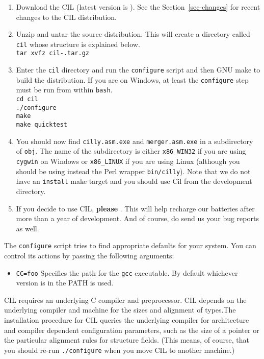 \documentclass{article}
\def\secref#1{Section~\ref{sec-#1}}
\newcommand{\hsp}{\hspace{0.5in}}
\def\t#1{{\tt #1}}
\begin{document}
\begin{enumerate}
\item Download the CIL  (latest version is
). See the \secref{changes} for recent changes to the CIL distribution.
\item Unzip and untar the source distribution. This will create a directory
      called \t{cil} whose structure is explained below. \\
      \t{tar xvfz cil-\cilversion.tar.gz}
\item Enter the \t{cil} directory and run the \t{configure} script and then 
      GNU make to build the distribution. If you are on Windows, at least the
      \t{configure} step must be run from within \t{bash}. \\
      \hsp\verb!cd cil!\\
      \hsp\verb!./configure!\\
      \hsp\verb!make!\\
      \hsp\verb!make quicktest!\\

\item You should now find \t{cilly.asm.exe} and \t{merger.asm.exe} in a
subdirectory of \t{obj}. The name of the subdirectory is either \t{x86\_WIN32}
if you are using \t{cygwin} on Windows or \t{x86\_LINUX} if you are using
Linux (although you should be using instead the Perl wrapper \t{bin/cilly}).
Note that we do not have an \t{install} make target and you should use Cil
from the development directory. 
\item If you decide to use CIL, {\bf please}
. This will help recharge
our batteries after more than a year of development. And of course, do send us
your bug reports as well.

\end{enumerate}

 The \t{configure} script tries to find appropriate defaults for your system.
You can control its actions by passing the following arguments:
\begin{itemize}
\item \t{CC=foo} Specifies the path for the \t{gcc} executable. By default
whichever version is in the PATH is used.
\end{itemize}

 CIL requires an underlying C compiler and preprocessor. CIL depends on the
underlying compiler and machine for the sizes and alignment of types.The
installation procedure for CIL queries the underlying compiler for
architecture and compiler dependent configuration parameters, such as the size
of a pointer or the particular alignment rules for structure fields. (This
means, of course, that you should re-run \t{./configure} when you move CIL to
another machine.)
\end{document}
